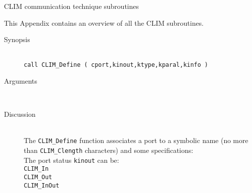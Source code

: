 \newpage
\begin{section}{CLIM communication technique subroutines}
\label{app_routines}


This Appendix contains an overview of all the CLIM subroutines.
\end{section}
\newpage

%
%
%
\begin{description}
  \item[Synopsis]~ \\[10pt]
        {\tt call CLIM\_Define ( cport,kinout,ktype,kparal,kinfo )}
  \item[Arguments]~
  \item[Discussion]~\\[10pt]
    The {\tt CLIM\_Define} function associates a port to
    a symbolic name (no more than {\tt CLIM\_Clength} characters) and
    some specifications:  \\

    The port status {\tt kinout} can be: \\
    \hspace*{2cm} {\tt CLIM\_In} \\
    \hspace*{2cm} {\tt CLIM\_Out} \\
    \hspace*{2cm} {\tt CLIM\_InOut} \\


\end{description}
